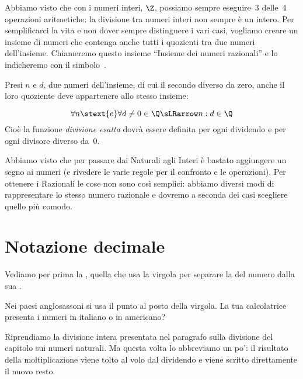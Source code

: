 % 

Abbiamo visto che con i numeri interi, \(\Z\), possiamo sempre eseguire~3 
delle~4 operazioni aritmetiche: la divisione tra numeri interi non sempre è 
un intero. Per semplificarci la vita e non dover sempre distinguere i vari 
casi, vogliamo creare un insieme di numeri che contenga anche tutti i 
quozienti tra due numeri dell'insieme. 
Chiameremo questo insieme ``Insieme dei numeri razionali'' e lo 
indicheremo con il simbolo~\indt{\(\Q\)}.

Presi \(n\) e \(d\), due numeri dell'insieme, di cui il secondo diverso da 
zero, anche il loro quoziente deve appartenere allo stesso insieme:

\vspace{-1em}
\[\forall n \stext{e} \forall d \neq 0 \in \Q \sLRarrow n : d \in \Q\]
Cioè la funzione \emph{divisione esatta} dovrà essere definita per ogni 
dividendo e per ogni divisore diverso da~0.

Abbiamo visto che per passare dai Naturali agli Interi è bastato aggiungere 
un segno ai numeri (e rivedere le varie regole per il confronto e le 
operazioni).
Per ottenere i Razionali le cose non sono così semplici: abbiamo 
diversi modi di rappresentare lo stesso numero 
razionale e dovremo a seconda dei casi scegliere quello più comodo.

\section{Notazione decimale}
\label{sec:razionali_notazione_decimale}

Vediamo per prima la , quella che 
usa la virgola per separare la  del numero dalla sua 
.

\begin{osservazione}{}{}
Nei paesi anglosassoni si usa il punto al posto della virgola. La tua 
calcolatrice presenta i numeri in italiano o in americano?
\end{osservazione}

Riprendiamo la divisione intera presentata nel paragrafo sulla divisione 
del capitolo sui numeri naturali.
Ma questa volta lo abbreviamo un po': il risultato della moltiplicazione 
viene tolto al volo dal dividendo e viene scritto direttamente il nuovo 
resto. 

\vspace{.5em}


